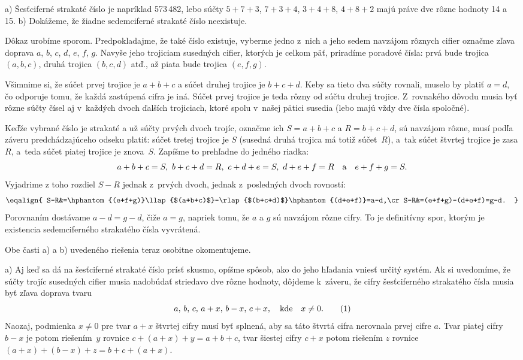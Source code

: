 {%
a) Šesťciferné strakaté číslo je napríklad 573\,482, lebo
súčty $5+7+3$, ${7+3+4}$, $3+4+8$, $4+8+2$ majú práve dve rôzne
hodnoty 14 a 15.
\smallskip
b) Dokážeme, že žiadne sedemciferné strakaté číslo neexistuje.

Dôkaz urobíme sporom. Predpokladajme, že také číslo existuje,
vyberme jedno z~nich a jeho sedem navzájom rôznych cifier
označme zľava doprava $a$, $b$, $c$, $d$, $e$, $f$, $g$. Navyše
jeho trojiciam susedných cifier, ktorých je celkom päť, priradíme
poradové čísla: prvá bude trojica $(a,b,c)$, druhá trojica
$(b,c,d)$ atď., až piata bude trojica $(e,f,g)$.

Všimnime si, že súčet prvej trojice je $a+b+c$ a súčet druhej
trojice je ${b+c+d}$. Keby sa tieto dva súčty rovnali, muselo by
platiť $a=d$, čo odporuje tomu, že každá zastúpená cifra je iná.
Súčet prvej trojice je teda rôzny od súčtu druhej trojice.
Z~rovnakého dôvodu musia byť rôzne súčty čísel aj
v~každých dvoch ďalších trojiciach, ktoré spolu v~našej pätici susedia
(lebo majú vždy dve čísla spoločné).

Keďže vybrané číslo je strakaté a už súčty prvých
dvoch trojíc, označme ich $S={a+b+c}$ a $R=b+c+d$,
sú navzájom rôzne, musí podľa záveru predchádzajúceho odseku platiť:
súčet tretej trojice je $S$ (susedná druhá trojica má totiž súčet~$R$),
a~tak súčet štvrtej trojice je zasa $R$, a~teda súčet piatej
trojice je znova~$S$. Zapíšme to prehľadne do jedného riadka:
$$
a+b+c=S,\ b+c+d=R,\ c+d+e=S,\ d+e+f=R\quad\hbox{a}\quad e+f+g=S.
$$
Vyjadrime z toho rozdiel $S-R$ jednak z~prvých dvoch, jednak
z~posledných dvoch rovností:
$$\eqalign{
S-R&=\hphantom{(e+f+g)}\llap{$(a+b+c)$}-\rlap{$(b+c+d)$}\hphantom{(d+e+f)}=a-d,\cr
S-R&=(e+f+g)-(d+e+f)=g-d.
}$$
Porovnaním dostávame $a-d=g-d$, čiže $a=g$, napriek tomu, že $a$ a $g$
sú navzájom rôzne cifry. To je definitívny
spor, ktorým je existencia sedemciferného strakatého čísla
vyvrátená.

\poznamka
Obe časti a) a b) uvedeného riešenia teraz osobitne okomentujeme.

\smallskip
a) Aj keď sa dá na šesťciferné strakaté číslo prísť skusmo, opíšme
spôsob, ako do jeho hľadania vniesť určitý systém.
Ak si uvedomíme, že súčty trojíc susedných cifier musia
nadobúdať striedavo dve rôzne hodnoty, dôjdeme k~záveru, že cifry
šesťciferného strakatého čísla musia byť zľava doprava tvaru
$$
a,\,b,\,c,\,a+x,\,b-x,\,c+x,\quad\hbox{kde}\quad x\ne0.
\tag1
$$
Naozaj, podmienka $x\ne0$ pre tvar $a+x$ štvrtej cifry musí
byť splnená, aby sa táto štvrtá cifra nerovnala prvej
cifre $a$. Tvar piatej cifry $b-x$
je potom riešením~$y$ rovnice $c+(a+x)+y=a+b+c$,
tvar šiestej cifry $c+x$ potom riešením $z$
rovnice $(a+x)+(b-x)+z=b+c+(a+x)$.

}
